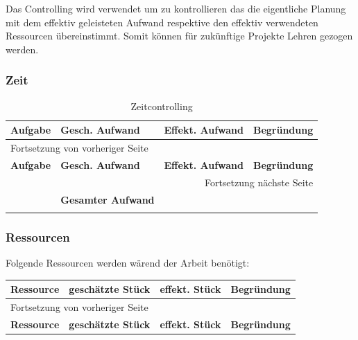 Das Controlling wird verwendet um zu kontrollieren das die eigentliche Planung
mit dem effektiv geleisteten Aufwand respektive den effektiv verwendeten
Ressourcen übereinstimmt. Somit können für zukünftige Projekte Lehren gezogen
werden.

\newpage
\begin{landscape}
\subsubsection{Zeit}
\label{sec:org40b0db6}

\begin{longtable}{|p{3cm}|p{5cm}|p{3cm}|p{7cm}|}
\hline
\textbf{Aufgabe}\cellcolor[HTML]{C0C0C0} & \textbf{Gesch. Aufwand}\cellcolor[HTML]{C0C0C0} & \textbf{Effekt. Aufwand}\cellcolor[HTML]{C0C0C0} & \textbf{Begründung}\cellcolor[HTML]{C0C0C0}\\
\hline
\endfirsthead
\multicolumn{4}{l}{Fortsetzung von vorheriger Seite} \\
\hline

\textbf{Aufgabe}\cellcolor[HTML]{C0C0C0} & \textbf{Gesch. Aufwand}\cellcolor[HTML]{C0C0C0} & \textbf{Effekt. Aufwand}\cellcolor[HTML]{C0C0C0} & \textbf{Begründung}\cellcolor[HTML]{C0C0C0} \\

\hline
\endhead
\hline\multicolumn{4}{r}{Fortsetzung nächste Seite} \\
\endfoot
\endlastfoot
\hline
\hline
 & \textbf{Gesamter Aufwand} &  & \\
\hline
\caption{\label{tab:org666fef9}
Zeitcontrolling}
\\
\end{longtable}

\newpage
\subsubsection{Ressourcen}
\label{sec:orgc2ff234}

Folgende Ressourcen werden wärend der Arbeit benötigt:
\begin{longtable}{|p{5cm}|p{3cm}|p{3cm}|p{7cm}|}
\hline
\textbf{Ressource}\cellcolor[HTML]{C0C0C0} & \textbf{geschätzte Stück}\cellcolor[HTML]{C0C0C0} & \textbf{effekt. Stück}\cellcolor[HTML]{C0C0C0} & \textbf{Begründung}\cellcolor[HTML]{C0C0C0}\\
\hline
\endfirsthead
\multicolumn{4}{l}{Fortsetzung von vorheriger Seite} \\
\hline

\textbf{Ressource}\cellcolor[HTML]{C0C0C0} & \textbf{geschätzte Stück}\cellcolor[HTML]{C0C0C0} & \textbf{effekt. Stück}\cellcolor[HTML]{C0C0C0} & \textbf{Begründung}\cellcolor[HTML]{C0C0C0} \\


\end{longtable}
\end{landscape}
